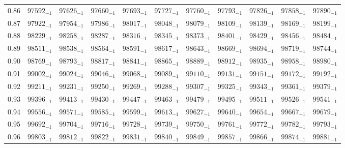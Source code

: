 \documentclass[10pt, a4paper]{article}
\begin{document}
\begin{center}
\begin{longtable}{c | c c c c c | c c c c c}
        0.86 & \({97592}_{-1}\) & \({97626}_{-1}\) & \({97660}_{-1}\) & \({97693}_{-1}\) & \({97727}_{-1}\) & \({97760}_{-1}\) & \({97793}_{-1}\) & \({97826}_{-1}\) & \({97858}_{-1}\) & \({97890}_{-1}\)\\
        0.87 & \({97922}_{-1}\) & \({97954}_{-1}\) & \({97986}_{-1}\) & \({98017}_{-1}\) & \({98048}_{-1}\) & \({98079}_{-1}\) & \({98109}_{-1}\) & \({98139}_{-1}\) & \({98169}_{-1}\) & \({98199}_{-1}\)\\
        0.88 & \({98229}_{-1}\) & \({98258}_{-1}\) & \({98287}_{-1}\) & \({98316}_{-1}\) & \({98345}_{-1}\) & \({98373}_{-1}\) & \({98401}_{-1}\) & \({98429}_{-1}\) & \({98456}_{-1}\) & \({98484}_{-1}\)\\
        0.89 & \({98511}_{-1}\) & \({98538}_{-1}\) & \({98564}_{-1}\) & \({98591}_{-1}\) & \({98617}_{-1}\) & \({98643}_{-1}\) & \({98669}_{-1}\) & \({98694}_{-1}\) & \({98719}_{-1}\) & \({98744}_{-1}\)\\
        0.90 & \({98769}_{-1}\) & \({98793}_{-1}\) & \({98817}_{-1}\) & \({98841}_{-1}\) & \({98865}_{-1}\) & \({98889}_{-1}\) & \({98912}_{-1}\) & \({98935}_{-1}\) & \({98958}_{-1}\) & \({98980}_{-1}\)\\
        0.91 & \({99002}_{-1}\) & \({99024}_{-1}\) & \({99046}_{-1}\) & \({99068}_{-1}\) & \({99089}_{-1}\) & \({99110}_{-1}\) & \({99131}_{-1}\) & \({99151}_{-1}\) & \({99172}_{-1}\) & \({99192}_{-1}\)\\
        0.92 & \({99211}_{-1}\) & \({99231}_{-1}\) & \({99250}_{-1}\) & \({99269}_{-1}\) & \({99288}_{-1}\) & \({99307}_{-1}\) & \({99325}_{-1}\) & \({99343}_{-1}\) & \({99361}_{-1}\) & \({99379}_{-1}\)\\
        0.93 & \({99396}_{-1}\) & \({99413}_{-1}\) & \({99430}_{-1}\) & \({99447}_{-1}\) & \({99463}_{-1}\) & \({99479}_{-1}\) & \({99495}_{-1}\) & \({99511}_{-1}\) & \({99526}_{-1}\) & \({99541}_{-1}\)\\
        0.94 & \({99556}_{-1}\) & \({99571}_{-1}\) & \({99585}_{-1}\) & \({99599}_{-1}\) & \({99613}_{-1}\) & \({99627}_{-1}\) & \({99640}_{-1}\) & \({99654}_{-1}\) & \({99667}_{-1}\) & \({99679}_{-1}\)\\
        0.95 & \({99692}_{-1}\) & \({99704}_{-1}\) & \({99716}_{-1}\) & \({99728}_{-1}\) & \({99739}_{-1}\) & \({99750}_{-1}\) & \({99761}_{-1}\) & \({99772}_{-1}\) & \({99782}_{-1}\) & \({99793}_{-1}\)\\
        0.96 & \({99803}_{-1}\) & \({99812}_{-1}\) & \({99822}_{-1}\) & \({99831}_{-1}\) & \({99840}_{-1}\) & \({99849}_{-1}\) & \({99857}_{-1}\) & \({99866}_{-1}\) & \({99874}_{-1}\) & \({99881}_{-1}\)\\

\end{longtable}
\end{center}
\end{document}
